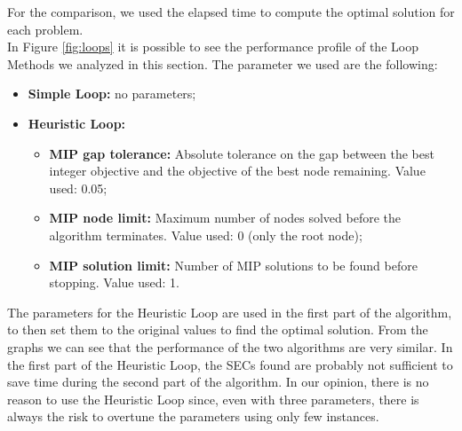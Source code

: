 \noindent
For the comparison, we used the elapsed time to compute the optimal solution for each problem.\\
In Figure \ref{fig:loops} it is possible to see the performance profile of the Loop Methods we analyzed in this section.
The parameter we used are the following:
\begin{itemize}
 	\item \textbf{Simple Loop:} no parameters;
	\item \textbf{Heuristic Loop:} 
	\begin{itemize} 
		\item \textbf{MIP gap tolerance:} Absolute tolerance on the gap between the best integer objective and the objective of the best node remaining. Value used: 0.05;
		\item \textbf{MIP node limit:} Maximum number of nodes solved before the algorithm terminates. Value used: 0 (only the root node);
		\item \textbf{MIP solution limit:} Number of MIP solutions to be found before stopping. Value used: 1.
		\end{itemize}
\end{itemize}
The parameters for the Heuristic Loop are used in the first part of the algorithm, to then set them to the original values to find the optimal solution.
From the graphs we can see that the performance of the two algorithms are very similar.  In the first part of the Heuristic Loop, the SECs found are probably not sufficient to save time during the second part of the algorithm. In our opinion, there is no reason to use the Heuristic Loop since, even with three parameters, there is always the risk to overtune the parameters using only few instances.

